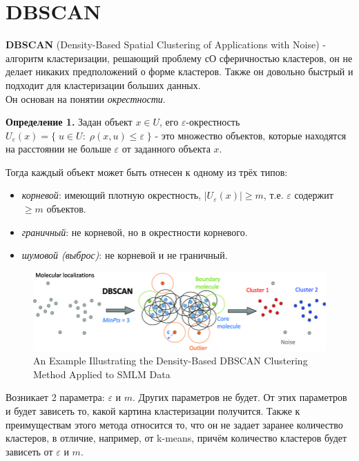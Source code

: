 \section{DBSCAN}

\textbf{DBSCAN} (Density-Based Spatial Clustering of Applications with Noise) - алгоритм кластеризации, решающий проблему сО сферичностью кластеров, он не делает никаких предположений о форме кластеров. Также он довольно быстрый и подходит для кластеризации больших данных.
\\
Он основан на понятии {\textit{окрестности}}.

\textbf{Определение 1.} Задан объект $x \in U$, его $\varepsilon$-окрестность $U_\varepsilon (x) = \{\;u\in U:\; \rho (x,u) \leq \varepsilon \;\}$ - это множество объектов, которые находятся на расстоянии не больше $\varepsilon$ от заданного объекта $x$.

\newcommand{\abs}[1]{\left|#1\right|}

Тогда каждый объект может быть отнесен к одному из трёх типов:
\begin{itemize}
    \item \textit{корневой}: имеющий плотную окрестность,  {$\abs{U_\varepsilon (x)} \geq m$}, т.е. $\varepsilon$ содержит $\geq m$ объектов.
    \item \textit{граничный}: не корневой, но в окрестности корневого.
    \item \textit{шумовой (выброс)}: не корневой и не граничный.
\end{itemize}
\begin{figure}[h!]
    \centering
    \includegraphics[width=0.9\linewidth]{chapters/clustering/png/An-Example-Illustrating-the-Density-Based-DBSCAN-Clustering-Method-Applied-to-SMLM-Data.png}
    \caption{An Example Illustrating the Density-Based DBSCAN Clustering Method Applied to SMLM Data}
    \label{fig:enter-label-2}
\end{figure}
Возникает 2 параметра: $\varepsilon$ и $m$. Других параметров не будет. От этих параметров и будет зависеть то, какой картина кластеризации получится. Также к преимуществам этого метода относится то, что он не задает заранее количество кластеров, в отличие, например, от k-means, причём количество кластеров будет зависеть от $\varepsilon$ и $m$. 

